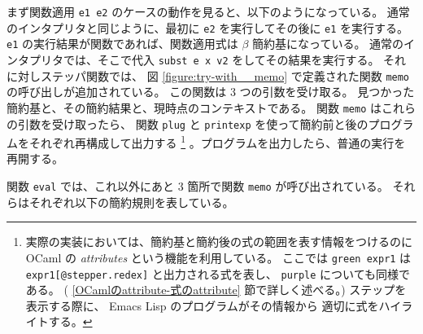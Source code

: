 まず関数適用 \texttt{e1 e2} のケースの動作を見ると、以下のようになっている。
通常のインタプリタと同じように、最初に \texttt{e2} を実行してその後に \texttt{e1} を実行する。
\texttt{e1} の実行結果が関数であれば、関数適用式は $\beta$ 簡約基になっている。
通常のインタプリタでは、そこで代入 \texttt{subst e x v2} をしてその結果を実行する。
それに対しステッパ関数では、
図 \ref{figure:try-with__memo} で定義された関数 \texttt{memo} の呼び出しが追加されている。
この関数は 3 つの引数を受け取る。
見つかった簡約基と、その簡約結果と、現時点のコンテキストである。
関数 \texttt{memo} はこれらの引数を受け取ったら、
関数 \texttt{plug} と \texttt{print\US exp} を使って簡約前と後のプログラムをそれぞれ再構成して出力する
\footnote{
    実際の実装においては、簡約基と簡約後の式の範囲を表す情報をつけるのに
    OCaml の \emph{attributes} という機能を利用している。
    ここでは \texttt{green expr1} は \texttt{expr1[@stepper.redex]} と出力される式を表し、
    \texttt{purple} についても同様である。
    ( \ref{OCamlのattribute-式のattribute} 節で詳しく述べる。)
    ステップを表示する際に、 Emacs Lisp のプログラムがその情報から
    適切に式をハイライトする。
    }
    。プログラムを出力したら、普通の実行を再開する。

関数 \texttt{eval} では、これ以外にあと 3 箇所で関数 \texttt{memo} が呼び出されている。
それらはそれぞれ以下の簡約規則を表している。

